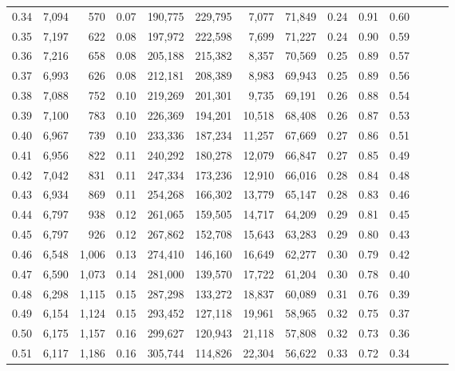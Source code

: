 \begin{tabular}{rrrrrrrrrrrrrr}
0.34 &   7,094 &    570 &  0.07 &  190,775 &  229,795 &   7,077 &  71,849 &  0.24 &  0.91 &      0.60 \\
0.35 &   7,197 &    622 &  0.08 &  197,972 &  222,598 &   7,699 &  71,227 &  0.24 &  0.90 &      0.59 \\
0.36 &   7,216 &    658 &  0.08 &  205,188 &  215,382 &   8,357 &  70,569 &  0.25 &  0.89 &      0.57 \\
0.37 &   6,993 &    626 &  0.08 &  212,181 &  208,389 &   8,983 &  69,943 &  0.25 &  0.89 &      0.56 \\
0.38 &   7,088 &    752 &  0.10 &  219,269 &  201,301 &   9,735 &  69,191 &  0.26 &  0.88 &      0.54 \\
0.39 &   7,100 &    783 &  0.10 &  226,369 &  194,201 &  10,518 &  68,408 &  0.26 &  0.87 &      0.53 \\
0.40 &   6,967 &    739 &  0.10 &  233,336 &  187,234 &  11,257 &  67,669 &  0.27 &  0.86 &      0.51 \\
0.41 &   6,956 &    822 &  0.11 &  240,292 &  180,278 &  12,079 &  66,847 &  0.27 &  0.85 &      0.49 \\
0.42 &   7,042 &    831 &  0.11 &  247,334 &  173,236 &  12,910 &  66,016 &  0.28 &  0.84 &      0.48 \\
0.43 &   6,934 &    869 &  0.11 &  254,268 &  166,302 &  13,779 &  65,147 &  0.28 &  0.83 &      0.46 \\
0.44 &   6,797 &    938 &  0.12 &  261,065 &  159,505 &  14,717 &  64,209 &  0.29 &  0.81 &      0.45 \\
0.45 &   6,797 &    926 &  0.12 &  267,862 &  152,708 &  15,643 &  63,283 &  0.29 &  0.80 &      0.43 \\
0.46 &   6,548 &  1,006 &  0.13 &  274,410 &  146,160 &  16,649 &  62,277 &  0.30 &  0.79 &      0.42 \\
0.47 &   6,590 &  1,073 &  0.14 &  281,000 &  139,570 &  17,722 &  61,204 &  0.30 &  0.78 &      0.40 \\
0.48 &   6,298 &  1,115 &  0.15 &  287,298 &  133,272 &  18,837 &  60,089 &  0.31 &  0.76 &      0.39 \\
0.49 &   6,154 &  1,124 &  0.15 &  293,452 &  127,118 &  19,961 &  58,965 &  0.32 &  0.75 &      0.37 \\
0.50 &   6,175 &  1,157 &  0.16 &  299,627 &  120,943 &  21,118 &  57,808 &  0.32 &  0.73 &      0.36 \\
0.51 &   6,117 &  1,186 &  0.16 &  305,744 &  114,826 &  22,304 &  56,622 &  0.33 &  0.72 &      0.34 \\

\end{tabular}
